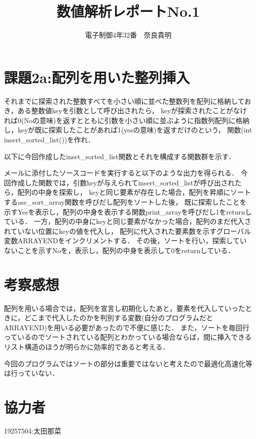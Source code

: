 \documentclass[titlepage]{jarticle}
\title{数値解析レポートNo.1}
\author{電子制御4年32番　奈良貴明}
\begin{document}
\section*{課題2a:配列を用いた整列挿入}

それまでに探索された整数すべてを小さい順に並べた整数列を配列に格納しておき，ある整数値keyを引数として呼び出されたら，
keyが探索されたことがなければ0(Noの意味)を返すとともに引数を小さい順に並ぶように指数列配列に格納し，keyが既に探索したことがあれば1(yesの意味)を返すだけのという，
関数(int insert\_sorted\_list())を作れ． 

以下に今回作成したinset\_sorted\_list関数とそれを構成する関数群を示す．

メールに添付したソースコードを実行すると以下のような出力を得られる．
今回作成した関数では，引数keyが与えられてinsert\_sorted\_listが呼び出されたら，配列の中身を探索し，
keyと同じ要素が存在した場合，配列を昇順にソートするasc\_sort\_array関数を呼びだし配列をソートした後，
既に探索したことを示すYesを表示し，配列の中身を表示する関数print\_arrayを呼びだし1をreturnしている．
一方，配列の中身にkeyと同じ要素がなかった場合，配列のまだ代入されていない位置にkeyの値を代入し，
配列に代入された要素数を示すグローバル変数ARRAYENDをインクリメントする．
その後，ソートを行い，探索していないことを示すNoを，表示し，配列の中身を表示して0をreturnしている．
\section*{考察感想}
配列を用いる場合では，配列を宣言し初期化したあと，要素を代入していったときに，どこまで代入したのかを判別する変数(自分のプログラムだとARRAYEND)を用いる必要があったので不便に感じた．
また，ソートを毎回行っているのでソートされている配列とわかっている場合ならば，間に挿入できるリスト構造のほうが明らかに効率的であると考える．

今回のプログラムではソートの部分は重要ではないと考えたので最適化高速化等は行っていない．

\section*{協力者}
19257504:太田那菜
\end{document}
